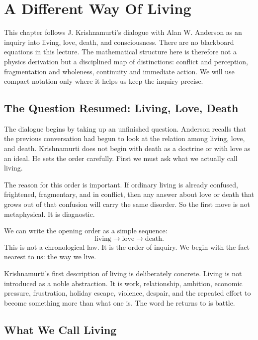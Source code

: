 \chapter{A Different Way Of Living}

This chapter follows J. Krishnamurti's dialogue with Alan W. Anderson as an inquiry into living, love, death, and consciousness. There are no blackboard equations in this lecture. The mathematical structure here is therefore not a physics derivation but a disciplined map of distinctions: conflict and perception, fragmentation and wholeness, continuity and immediate action. We will use compact notation only where it helps us keep the inquiry precise.

\section{The Question Resumed: Living, Love, Death}

The dialogue begins by taking up an unfinished question. Anderson recalls that the previous conversation had begun to look at the relation among living, love, and death. Krishnamurti does not begin with death as a doctrine or with love as an ideal. He sets the order carefully. First we must ask what we actually call living.

The reason for this order is important. If ordinary living is already confused, frightened, fragmentary, and in conflict, then any answer about love or death that grows out of that confusion will carry the same disorder. So the first move is not metaphysical. It is diagnostic.

We can write the opening order as a simple sequence:
\begin{equation}
\text{living} \longrightarrow \text{love} \longrightarrow \text{death}.
\end{equation}
This is not a chronological law. It is the order of inquiry. We begin with the fact nearest to us: the way we live.

Krishnamurti's first description of living is deliberately concrete. Living is not introduced as a noble abstraction. It is work, relationship, ambition, economic pressure, frustration, holiday escape, violence, despair, and the repeated effort to become something more than what one is. The word he returns to is battle.

\section{What We Call Living}

